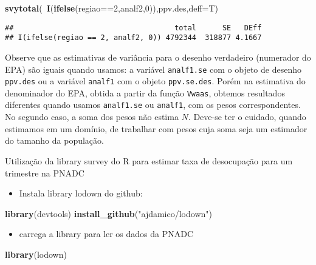 \documentclass[]{book}
\newenvironment{Shaded}{\begin{snugshade}}{\end{snugshade}}
\newcommand{\KeywordTok}[1]{\textcolor[rgb]{0.13,0.29,0.53}{\textbf{{#1}}}}
\newcommand{\DataTypeTok}[1]{\textcolor[rgb]{0.13,0.29,0.53}{{#1}}}
\newcommand{\DecValTok}[1]{\textcolor[rgb]{0.00,0.00,0.81}{{#1}}}
\newcommand{\StringTok}[1]{\textcolor[rgb]{0.31,0.60,0.02}{{#1}}}
\newcommand{\NormalTok}[1]{{#1}}
\providecommand{\tightlist}{%
  \setlength{\itemsep}{0pt}\setlength{\parskip}{0pt}}
\numberwithin{example}{chapter}
\numberwithin{remark}{chapter}
\numberwithin{definition}{chapter}
\let\BeginKnitrBlock\begin \let\EndKnitrBlock\end
\begin{document}
\begin{Shaded}
\begin{Highlighting}[]
\KeywordTok{svytotal}\NormalTok{(~}\KeywordTok{I}\NormalTok{(}\KeywordTok{ifelse}\NormalTok{(regiao==}\DecValTok{2}\NormalTok{,analf2,}\DecValTok{0}\NormalTok{)),ppv.des,}\DataTypeTok{deff=}\NormalTok{T)}
\end{Highlighting}
\end{Shaded}

\begin{verbatim}
##                                     total      SE   DEff
## I(ifelse(regiao == 2, analf2, 0)) 4792344  318877 4.1667
\end{verbatim}

Observe que as estimativas de variância para o desenho verdadeiro
(numerador do EPA) são iguais quando usamos: a variável
\texttt{analf1.se} com o objeto de desenho \texttt{ppv.des} ou a
variável \texttt{analf1} com o objeto \texttt{ppv.se.des}. Porém na
estimativa do denominador do EPA, obtida a partir da função
\texttt{Vwaas}, obtemos resultados diferentes quando usamos
\texttt{analf1.se} ou \texttt{analf1}, com os pesos correspondentes. No
segundo caso, a soma dos pesos não estima \(N\). Deve-se ter o cuidado,
quando estimamos em um domínio, de trabalhar com pesos cuja soma seja um
estimador do tamanho da população.

\BeginKnitrBlock{example}
\protect\hypertarget{ex:unnamed-chunk-15}{}{\label{ex:unnamed-chunk-15}}Utilização
da library survey do R para estimar taxa de desocupação para um
trimestre na PNADC
\EndKnitrBlock{example}

\begin{itemize}
\tightlist
\item
  Instala library lodown do github:
\end{itemize}

\begin{Shaded}
\begin{Highlighting}[]
\KeywordTok{library}\NormalTok{(devtools)}
\KeywordTok{install_github}\NormalTok{(}\StringTok{"ajdamico/lodown"}\NormalTok{)}
\end{Highlighting}
\end{Shaded}

\begin{itemize}
\tightlist
\item
  carrega a library para ler os dados da PNADC
\end{itemize}

\begin{Shaded}
\begin{Highlighting}[]
\KeywordTok{library}\NormalTok{(lodown)}
\end{Highlighting}
\end{Shaded}
\end{document}
